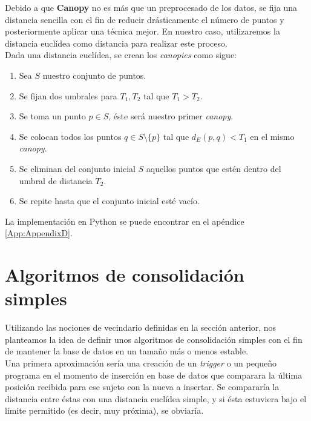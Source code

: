 \documentclass[a4paper, 12pt]{article}
\begin{document}
Debido a que \textbf{Canopy} no es m\'as que un preprocesado de los datos, se fija una distancia sencilla con el fin de reducir dr\'asticamente el n\'umero de puntos y posteriormente aplicar una t\'ecnica mejor. En nuestro caso, utilizaremos la distancia eucl\'idea como distancia para realizar este proceso. \\

Dada una distancia eucl\'idea, se crean los \textit{canopies} como sigue:\\

\begin{enumerate}
	\item Sea $S$ nuestro conjunto de puntos.
	\item Se fijan dos umbrales para $T_1, T_2$ tal que $T_1 > T_2$. 
	\item Se toma un punto $p\in S$, \'este ser\'a nuestro primer \textit{canopy}.
	\item Se colocan todos los puntos $q\in S\setminus\{p\}$ tal que $d_E(p, q) < T_1$ en el mismo \textit{canopy}. 
	\item Se eliminan del conjunto inicial $S$ aquellos puntos que est\'en dentro del umbral de distancia $T_2$.
	\item Se repite hasta que el conjunto inicial est\'e vac\'io.
\end{enumerate}

La implementaci\'on en Python se puede encontrar en el ap\'endice \ref{App:AppendixD}.\\

\pagebreak
\section{Algoritmos de consolidaci\'on simples}\label{sec:simple}

Utilizando las nociones de vecindario definidas en la secci\'on anterior, nos planteamos la idea de definir unos algoritmos de consolidaci\'on simples con el fin de mantener la base de datos en un tama\~no m\'as o menos estable. \\

Una primera aproximaci\'on ser\'ia una creaci\'on de un \textit{trigger} o un peque\~no programa en el momento de inserci\'on en base de datos que comparara la \'ultima posici\'on recibida para ese sujeto con la nueva a insertar. Se comparar\'ia la distancia entre \'estas con una distancia eucl\'idea simple, y si \'esta estuviera bajo el l\'imite permitido (es decir, muy pr\'oxima), se obviar\'ia. \\
\end{document}
